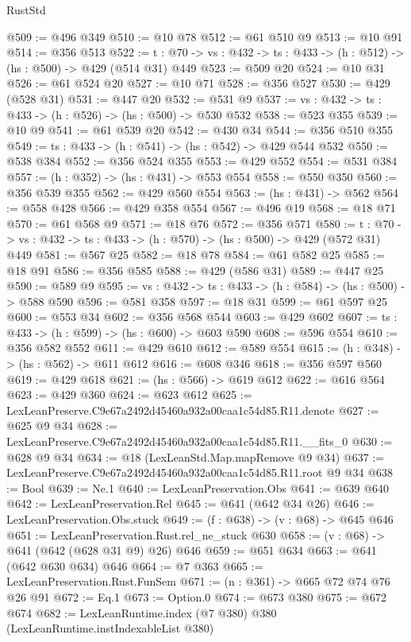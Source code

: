 \begin{lexlean}{RustStd}
\begin{coremodule}
@509 := @496 @349
@510 := @10 @78
@512 := @61 @510 @9
@513 := @10 @91
@514 := @356 @513
@522 := {t : @70} -> {vs : @432} -> {ts : @433} -> (h : @512) -> (hs : @500) -> @429 (@514 @31) @449
@523 := @509 @20
@524 := @10 @31
@526 := @61 @524 @20
@527 := @10 @71
@528 := @356 @527
@530 := @429 (@528 @31)
@531 := @447 @20
@532 := @531 @9
@537 := {vs : @432} -> {ts : @433} -> (h : @526) -> (hs : @500) -> @530 @532
@538 := @523 @355
@539 := @10 @9
@541 := @61 @539 @20
@542 := @430 @34
@544 := @356 @510 @355
@549 := {ts : @433} -> (h : @541) -> (hs : @542) -> @429 @544 @532
@550 := @538 @384
@552 := @356 @524 @355
@553 := @429 @552
@554 := @531 @384
@557 := (h : @352) -> (hs : @431) -> @553 @554
@558 := @550 @350
@560 := @356 @539 @355
@562 := @429 @560 @554
@563 := (hs : @431) -> @562
@564 := @558 @428
@566 := @429 @358 @554
@567 := @496 @19
@568 := @18 @71
@570 := @61 @568 @9
@571 := @18 @76
@572 := @356 @571
@580 := {t : @70} -> {vs : @432} -> {ts : @433} -> (h : @570) -> (hs : @500) -> @429 (@572 @31) @449
@581 := @567 @25
@582 := @18 @78
@584 := @61 @582 @25
@585 := @18 @91
@586 := @356 @585
@588 := @429 (@586 @31)
@589 := @447 @25
@590 := @589 @9
@595 := {vs : @432} -> {ts : @433} -> (h : @584) -> (hs : @500) -> @588 @590
@596 := @581 @358
@597 := @18 @31
@599 := @61 @597 @25
@600 := @553 @34
@602 := @356 @568 @544
@603 := @429 @602
@607 := {ts : @433} -> (h : @599) -> (hs : @600) -> @603 @590
@608 := @596 @554
@610 := @356 @582 @552
@611 := @429 @610
@612 := @589 @554
@615 := (h : @348) -> (hs : @562) -> @611 @612
@616 := @608 @346
@618 := @356 @597 @560
@619 := @429 @618
@621 := (hs : @566) -> @619 @612
@622 := @616 @564
@623 := @429 @360
@624 := @623 @612
@625 := LexLeanPreserve.C9e67a2492d45460a932a00caa1c54d85.R11.denote
@627 := @625 @9 @34
@628 := LexLeanPreserve.C9e67a2492d45460a932a00caa1c54d85.R11.__fits_0
@630 := @628 @9 @34
@634 := @18 (LexLeanStd.Map.mapRemove @9 @34)
@637 := LexLeanPreserve.C9e67a2492d45460a932a00caa1c54d85.R11.root @9 @34
@638 := Bool
@639 := Ne.{1}
@640 := LexLeanPreservation.Obs
@641 := @639 @640
@642 := LexLeanPreservation.Rel
@645 := @641 (@642 @34 @26)
@646 := LexLeanPreservation.Obs.stuck
@649 := (f : @638) -> (v : @68) -> @645 @646
@651 := LexLeanPreservation.Rust.rel_ne_stuck @630
@658 := (v : @68) -> @641 (@642 (@628 @31 @9) @26) @646
@659 := @651 @634
@663 := @641 (@642 @630 @634) @646
@664 := @7 @363
@665 := LexLeanPreservation.Rust.FunSem
@671 := (n : @361) -> @665 @72 @74 @76 @26 @91
@672 := Eq.{1}
@673 := Option.{0}
@674 := @673 @380
@675 := @672 @674
@682 := LexLeanRuntime.index (@7 @380) @380 (LexLeanRuntime.instIndexableList @380)

\end{coremodule}
\end{lexlean}
